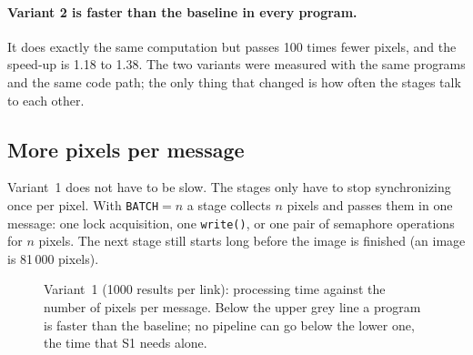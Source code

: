 \documentclass[11pt,a4paper]{article}
\begin{document}
\paragraph{Variant 2 is faster than the baseline in every program.} It does exactly the same
computation but passes 100 times fewer pixels, and the speed-up is 1.18 to 1.38. The two variants
were measured with the same programs and the same code path; the only thing that changed is how
often the stages talk to each other.

\subsection{More pixels per message}

Variant~1 does not have to be slow. The stages only have to stop synchronizing once per pixel.
With \texttt{BATCH}$=n$ a stage collects $n$ pixels and passes them in one message: one lock
acquisition, one \texttt{write()}, or one pair of semaphore operations for $n$ pixels. The next
stage still starts long before the image is finished (an image is 81\,000 pixels).

\begin{figure}[H]
\centering
{}
\caption{Variant~1 (1000 results per link): processing time against the number of pixels per
message. Below the upper grey line a program is faster than the baseline; no pipeline can go below
the lower one, the time that S1 needs alone.}
\label{fig:batch}
\end{figure}
\end{document}
